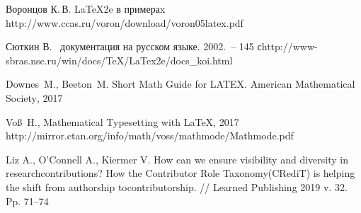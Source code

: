 \documentclass{psta}%
\begin{document}
\begin{thebibliography}{9}
\by  Воронцов К.\,В.
\eprint LaTeX2e в примераx
\URL http://www.ccas.ru/voron/download/voron05latex.pdf

    Сюткин В. \LaTeXe\ документация на русском языке. 2002.~\--- 145 с\URL http://www-sbras.nsc.ru/win/docs/TeX/LaTex2e/docs_koi.html

 Downes~M., Beeton~M. Short Math Guide for LATEX. \foreignlanguage{english}{American Mathematical Society}, 2017

 Vo\ss~H.,  Mathematical Typesetting with \LaTeX, 2017
    \URL http://mirror.ctan.org/info/math/voss/mathmode/Mathmode.pdf

 Liz A., O’Connell A., Kiermer V. How can we ensure visibility and diversity in researchcontributions? How the Contributor Role Taxonomy(CRediT) is helping the shift from authorship tocontributorship. // Learned Publishing 2019 v. 32. Pp. 71–74 

\end{thebibliography}
\AuthorImageWidth{19mm}
\makefinish
\end{document}
